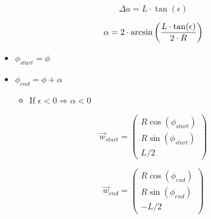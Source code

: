 \begin{equation}
  \Delta a = L \cdot \tan(\epsilon)
\end{equation}


\begin{equation}
  \alpha = 2 \cdot \arcsin\left({{L \cdot \tan(\epsilon)} \over {2
        \cdot R}}\right)
\end{equation}


\begin{itemize}
\item $\phi_{start}=\phi$
\item $\phi_{end}=\phi+\alpha$
  \begin{itemize}
  \item If $\epsilon<0 \Rightarrow \alpha<0$
  \end{itemize}
\end{itemize}

\begin{equation}
  \vec{w}_{start} = \begin{pmatrix}
    R \cos(\phi_{start}) \\
    R \sin(\phi_{start}) \\
    L/2
  \end{pmatrix}
\end{equation}

\begin{equation}
  \vec{w}_{end} = \begin{pmatrix}
    R \cos(\phi_{end}) \\
    R \sin(\phi_{end}) \\
    -L/2
  \end{pmatrix}
\end{equation}
